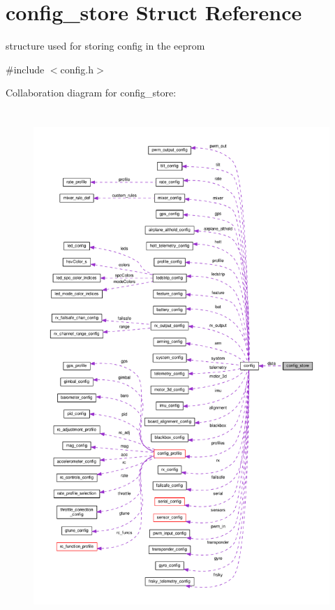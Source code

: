 \hypertarget{structconfig__store}{\section{config\+\_\+store Struct Reference}
\label{structconfig__store}
}


structure used for storing config in the eeprom  




{\ttfamily \#include $<$config.\+h$>$}



Collaboration diagram for config\+\_\+store\+:\nopagebreak
\begin{figure}[H]
\begin{center}
\leavevmode
\includegraphics[height=550pt]{structconfig__store__coll__graph}
\end{center}
\end{figure}
